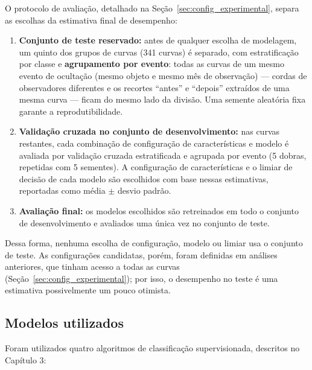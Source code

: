O protocolo de avaliação, detalhado na Seção~\ref{sec:config_experimental}, separa as escolhas da estimativa final de desempenho:

\begin{enumerate}
	\item \textbf{Conjunto de teste reservado:} antes de qualquer escolha de modelagem, um quinto dos grupos de curvas (341 curvas) é separado, com estratificação por classe e \textbf{agrupamento por evento}: todas as curvas de um mesmo evento de ocultação (mesmo objeto e mesmo mês de observação) --- cordas de observadores diferentes e os recortes ``antes'' e ``depois'' extraídos de uma mesma curva --- ficam do mesmo lado da divisão. Uma semente aleatória fixa garante a reprodutibilidade.
	\item \textbf{Validação cruzada no conjunto de desenvolvimento:} nas curvas restantes, cada combinação de configuração de características e modelo é avaliada por validação cruzada estratificada e agrupada por evento (5 dobras, repetidas com 5 sementes). A configuração de características e o limiar de decisão de cada modelo são escolhidos com base nessas estimativas, reportadas como média $\pm$ desvio padrão.
	\item \textbf{Avaliação final:} os modelos escolhidos são retreinados em todo o conjunto de desenvolvimento e avaliados uma única vez no conjunto de teste.
\end{enumerate}

Dessa forma, nenhuma escolha de configuração, modelo ou limiar usa o conjunto de teste. As configurações candidatas, porém, foram definidas em análises anteriores, que tinham acesso a todas as curvas (Seção~\ref{sec:config_experimental}); por isso, o desempenho no teste é uma estimativa possivelmente um pouco otimista.

\subsection{Modelos utilizados}

Foram utilizados quatro algoritmos de classificação supervisionada, descritos no Capítulo 3:

